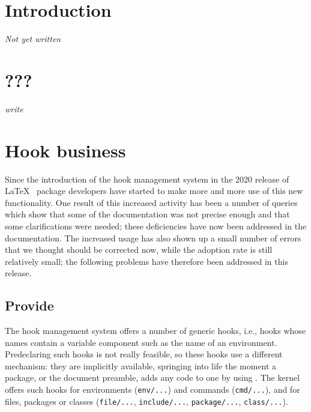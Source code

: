 \documentclass{ltnews}
\providecommand\tubcommand[1]{}
\begin{document}
\tubcommand{\addtolength\textheight{4.2pc}}   %

\maketitle
{ \spaceskip=3.33pt  \tableofcontents}

\setlength{}


\medskip


\section{Introduction}

\emph{Not yet written}

\section{???}

\emph{write}




\section{Hook business}

Since the introduction of the hook management system in the 2020
release of \LaTeX{}~\cite{34:ltnews32} package 
developers have started
to make more and more use of this new functionality. One result 
of this increased activity has been a
number of queries which show that some of the documentation was not
precise enough and that some clarifications were needed; these 
deficiencies have now been addressed in the documentation. 
%
The increased usage has also shown up a small number of 
errors that we thought
should be corrected now, while the adoption rate is still relatively
small; the following problems have therefore been addressed in this release.


\subsection{Provide }

The hook management system offers a number of generic hooks, i.e.,
hooks whose names contain a variable component such as the name
of an environment. Predeclaring such hooks is not really feasible, 
so these hooks use a different mechanism: they are
implicitly available, springing into life the moment a package, or 
the document preamble, adds any code to one by using .  
%
The kernel offers such hooks for environments
 (\texttt{env/...}) and commands (\texttt{cmd/...}), and for files, 
 packages or classes (\texttt{file/...},
\texttt{include/...}, \texttt{package/...}, \texttt{class/...}).
\end{document}
